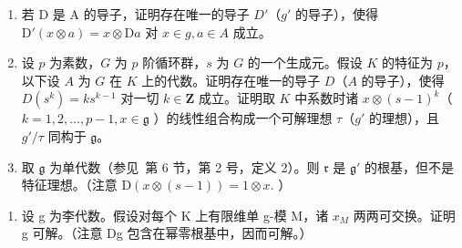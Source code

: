 \begin{enumerate}
\def\labelenumi{(\alph{enumi})}
\item
  若 D 是 A 的导子，证明存在唯一的导子 \(D'\)（\(g'\) 的导子），使得 \(\mathrm{D}'(x \otimes a) = x \otimes \mathrm{D}a\) 对 \(x \in g, a \in A\) 成立。
\item
  设 \(p\) 为素数，\(G\) 为 \(p\) 阶循环群，\(s\) 为 \(G\) 的一个生成元。假设 \(K\) 的特征为 \(p\)，以下设 \(A\) 为 \(G\) 在 \(K\) 上的代数。证明存在唯一的导子 \(D\)（\(A\) 的导子），使得 \(D(s^k) = ks^{k-1}\) 对一切 \(k \in \mathbf{Z}\) 成立。证明取 \(K\) 中系数时诸 \(x \otimes (s - 1)^k\)（ \(k = 1, 2, \ldots, p - 1, x \in \mathfrak{g}\) ）的线性组合构成一个可解理想 \(\tau\)（\(g'\) 的理想），且 \(g'/\tau\) 同构于 \(\mathfrak{g}\)。
\item
  取 \(\mathfrak{g}\) 为单代数（参见~第 6 节，第 2 号，定义 2）。则 \(\mathfrak{r}\) 是 \(\mathfrak{g}'\) 的根基，但不是特征理想。（注意 \(\mathrm{D}(x\otimes (s - 1)) = 1\otimes x.\) ）
\end{enumerate}

\begin{enumerate}
\def\labelenumi{\arabic{enumi}.}
\setcounter{enumi}{16}
\tightlist
\item
  设 g 为李代数。假设对每个 K 上有限维单 g-模 M，诸 \(x_{M}\) 两两可交换。证明 g 可解。（注意 Dg 包含在幂零根基中，因而可解。）
\end{enumerate}

